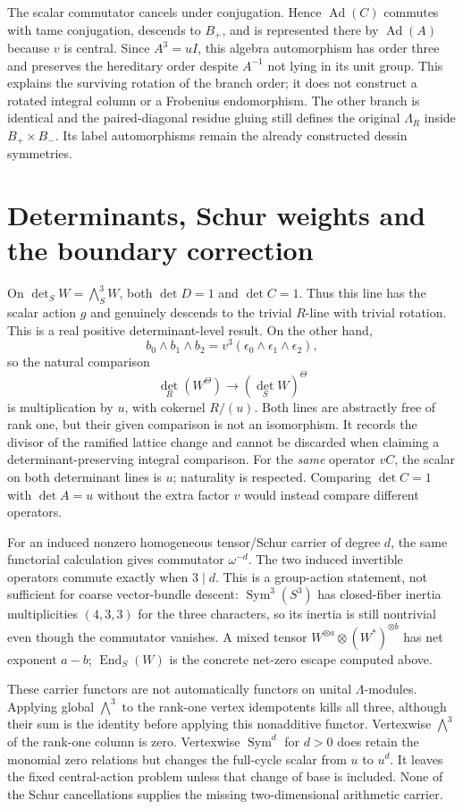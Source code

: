 \documentclass[11pt,oneside,openany]{book}
\theoremstyle{definition}\newtheorem{definition}[theorem]{Definition}
\theoremstyle{remark}\newtheorem{remark}[theorem]{Remark}
\begin{document}
The scalar commutator cancels under conjugation. Hence $\operatorname{Ad}(C)$ commutes with tame conjugation, descends to $B_+$, and is represented there by $\operatorname{Ad}(A)$ because $v$ is central. Since $A^3=uI$, this algebra automorphism has order three and preserves the hereditary order despite $A^{-1}$ not lying in its unit group. This explains the surviving rotation of the branch order; it does not construct a rotated integral column or a Frobenius endomorphism. The other branch is identical and the paired-diagonal residue gluing still defines the original $\Lambda_R$ inside $B_+\times B_-$. Its label automorphisms remain the already constructed dessin symmetries.

\section{Determinants, Schur weights and the boundary correction}
On $\det_S W=\bigwedge_S^3W$, both $\det D=1$ and $\det C=1$. Thus this line has the scalar action $g$ and genuinely descends to the trivial $R$-line with trivial rotation. This is a real positive determinant-level result. On the other hand,
\[
 b_0\wedge b_1\wedge b_2=v^3(\epsilon_0\wedge\epsilon_1\wedge\epsilon_2),
\]
so the natural comparison
\[
 \det_R(W^\Theta)\longrightarrow(\det_S W)^\Theta
\]
is multiplication by $u$, with cokernel $R/(u)$. Both lines are abstractly free of rank one, but their given comparison is not an isomorphism. It records the divisor of the ramified lattice change and cannot be discarded when claiming a determinant-preserving integral comparison. For the \emph{same} operator $vC$, the scalar on both determinant lines is $u$; naturality is respected. Comparing $\det C=1$ with $\det A=u$ without the extra factor $v$ would instead compare different operators.

For an induced nonzero homogeneous tensor/Schur carrier of degree $d$, the same functorial calculation gives commutator $\omega^{-d}$. The two induced invertible operators commute exactly when $3\mid d$. This is a group-action statement, not sufficient for coarse vector-bundle descent: $\operatorname{Sym}^3(S^3)$ has closed-fiber inertia multiplicities $(4,3,3)$ for the three characters, so its inertia is still nontrivial even though the commutator vanishes. A mixed tensor $W^{\otimes a}\otimes(W^*)^{\otimes b}$ has net exponent $a-b$; $\operatorname{End}_S(W)$ is the concrete net-zero escape computed above.

These carrier functors are not automatically functors on unital $\Lambda$-modules. Applying global $\bigwedge^3$ to the rank-one vertex idempotents kills all three, although their sum is the identity before applying this nonadditive functor. Vertexwise $\bigwedge^3$ of the rank-one column is zero. Vertexwise $\operatorname{Sym}^d$ for $d>0$ does retain the monomial zero relations but changes the full-cycle scalar from $u$ to $u^d$. It leaves the fixed central-action problem unless that change of base is included. None of the Schur cancellations supplies the missing two-dimensional arithmetic carrier.
\end{document}
